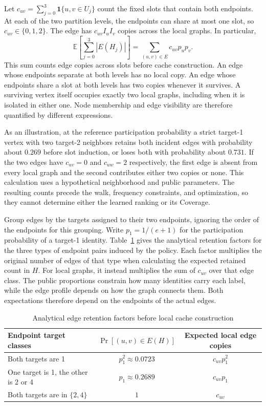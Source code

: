 Let $c_{uv}=\sum_{j=0}^{3}\mathbf{1}\{u,v\in U_j\}$ count the fixed slots that contain both endpoints. At each of the two partition levels, the endpoints can share at most one slot, so $c_{uv}\in\{0,1,2\}$. The edge has $c_{uv}I_u I_v$ copies across the local graphs. In particular,
\begin{equation}
 \mathbb E\!\left[\sum_{j=0}^{3}|E(H_j)|\right]
 =\sum_{(u,v)\in E}c_{uv}p_up_v .
 \label{eq:expected-slot-edges}
\end{equation}
This sum counts edge copies across slots before cache construction. An edge whose endpoints separate at both levels has no local copy. An edge whose endpoints share a slot at both levels has two copies whenever it survives. A surviving vertex itself occupies exactly two local graphs, including when it is isolated in either one. Node membership and edge visibility are therefore quantified by different expressions.

As an illustration, at the reference participation probability a strict target-1 vertex with two target-2 neighbors retains both incident edges with probability about $0.269$ before slot induction, or loses both with probability about $0.731$. If the two edges have $c_{uv}=0$ and $c_{uw}=2$ respectively, the first edge is absent from every local graph and the second contributes either two copies or none. This calculation uses a hypothetical neighborhood and public parameters. The resulting counts precede the walk, frequency constraints, and optimization, so they cannot determine either the learned ranking or its Coverage.

Group edges by the targets assigned to their two endpoints, ignoring the order of the endpoints for this grouping. Write $p_1=1/(e+1)$ for the participation probability of a target-1 identity. Table~\ref{tab:edge-retention} gives the analytical retention factors for the three types of endpoint pairs induced by the policy. Each factor multiplies the original number of edges of that type when calculating the expected retained count in $H$. For local graphs, it instead multiplies the sum of $c_{uv}$ over that edge class. The public proportions constrain how many identities carry each label, while the edge profile depends on how the graph connects them. Both expectations therefore depend on the endpoints of the actual edges.

\begin{table}[htbp]
\centering\small
\caption{Analytical edge retention factors before local cache construction}
\label{tab:edge-retention}
\begin{tabularx}{\textwidth}{@{}Xcc@{}}
\toprule
Endpoint target classes & $\Pr[(u,v)\in E(H)]$ & Expected local edge copies \\
\midrule
Both targets are 1 & $p_1^2\approx0.0723$ & $c_{uv}p_1^2$ \\
One target is 1, the other is 2 or 4 & $p_1\approx0.2689$ & $c_{uv}p_1$ \\
Both targets are in $\{2,4\}$ & $1$ & $c_{uv}$ \\
\bottomrule
\end{tabularx}
\end{table}

